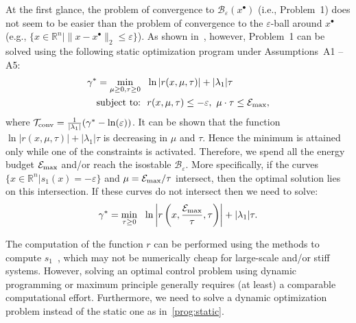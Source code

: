 \documentclass[letterpaper, 10pt, journal]{IEEEtran}  %
\newcommand{\R}{{\mathbb R}}
\newcommand{\cB}{{\mathcal B}}
\newcommand{\cE}{{\mathcal E}}
\newcommand{\cT}{{\mathcal T}}
\begin{document}
At the first glance, the problem of convergence to $\cB_\varepsilon(x^\bullet)$ (i.e., Problem~1) does not seem to be easier than the problem of convergence to the $\varepsilon$-ball around $x^\bullet$ (e.g., $\{x\in \R^n | \|x-x^\bullet\|_2 \le \varepsilon\}$). As shown in~\cite{sootla2016optimalswitching}, however, Problem~1 can be solved using the following static optimization program under Assumptions~{A1 -- A5}:
\begin{align}
\label{prog:static}\gamma^\ast= \min\limits_{\mu\ge 0, \tau\ge 0}~~   & \ln|r(x, \mu, \tau)| + |\lambda_1| \tau\\
\label{con:time}\text{subject to:}~~&  r(x,\mu,\tau)\le -\varepsilon, \,\, \mu\cdot \tau \le \cE_{\rm max},
\end{align}
where $\cT_{\rm conv}=\frac{1}{|\lambda_1|} (\gamma^\ast-\ln(\varepsilon))$. It can be shown that the function $\ln|r(x,\mu,\tau)| + {|\lambda_1|\tau}$ is decreasing in $\mu$ and $\tau$. Hence the minimum is attained only while one of the constraints is activated. Therefore, we spend all the energy budget $\cE_{\rm max}$ and/or reach the isostable $\cB_\varepsilon$. More specifically, 
if the curves $\{x \in \R^n| s_1(x) = -\varepsilon \}$ and $\mu = \cE_{\rm max}/\tau$ intersect, then the optimal solution lies on this intersection. If these curves do not intersect then we need to solve:
\begin{align}
\label{prog:static2}\gamma^\ast= \min\limits_{\tau\ge 0}~~ \ln\left|r\left(x, \frac{\cE_{\rm max}}{\tau}, \tau\right)\right|  + |\lambda_1| \tau.
\end{align}

The computation of the function $r$ can be performed using the methods to compute $s_1$~\cite{sootla2016optimalswitching}, which may not be numerically cheap for large-scale and/or stiff systems. However, solving an optimal control problem using dynamic programming or maximum principle generally requires (at least) a comparable computational effort. Furthermore, we need to solve a dynamic optimization problem instead of the static one as in~\eqref{prog:static}. 
	
\end{document}
